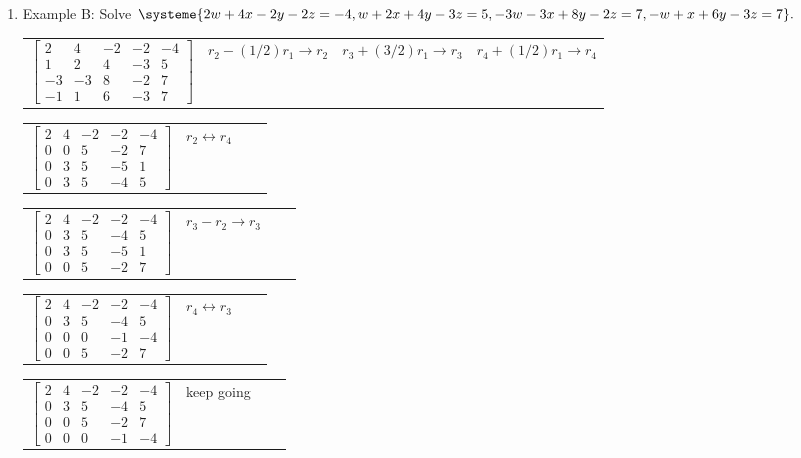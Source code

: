 \documentclass[11pt,fleqn]{article}
\newcommand{\bbm}{\begin{bmatrix}}
\newcommand{\ebm}{\end{bmatrix}}
\begin{document}
\begin{enumerate}
\vspace{2in}
\newpage
\item Example B: Solve $\systeme{2w+4x-2y-2z=-4,w+2x+4y-3z=5,-3w-3x+8y-2z=7,-w+x+6y-3z=7}.$\\

\vfill
\begin{tabularx}{\textwidth}{XXXX}
$\bbm 2&4&-2&-2&-4\\1&2&4&-3&5\\-3&-3&8&-2&7\\-1&1&6&-3&7 \ebm$ & $r_2-(1/2)r_1 \to r_2$&$r_3+(3/2)r_1 \to r_3$&$r_4+(1/2)r_1 \to r_4$\\
\end{tabularx}

\vfill

\begin{tabularx}{\textwidth}{XXXX}
$\bbm 2&4&-2&-2&-4\\0&0&5&-2&7\\0&3&5&-5&1\\0&3&5&-4&5 \ebm$ &$r_2 \leftrightarrow r_4$&&\\
\end{tabularx}

\vfill

\begin{tabularx}{\textwidth}{XXXX}$\bbm 2&4&-2&-2&-4\\0&3&5&-4&5\\0&3&5&-5&1\\ 0&0&5&-2&7\ebm$ &$r_3-r_2 \to r_3$&&\\
\end{tabularx}

\vfill

\begin{tabularx}{\textwidth}{XXXX}$\bbm 2&4&-2&-2&-4\\0&3&5&-4&5\\0&0&0&-1&-4\\ 0&0&5&-2&7\ebm$ &$r_4 \leftrightarrow r_3$&&\\
\end{tabularx}

\vfill

\begin{tabularx}{\textwidth}{XXXX}$\bbm 2&4&-2&-2&-4\\0&3&5&-4&5\\ 0&0&5&-2&7\\0&0&0&-1&-4\ebm$ &keep going&&\\

\end{tabularx}
\vfill




\end{enumerate}
\end{document}
